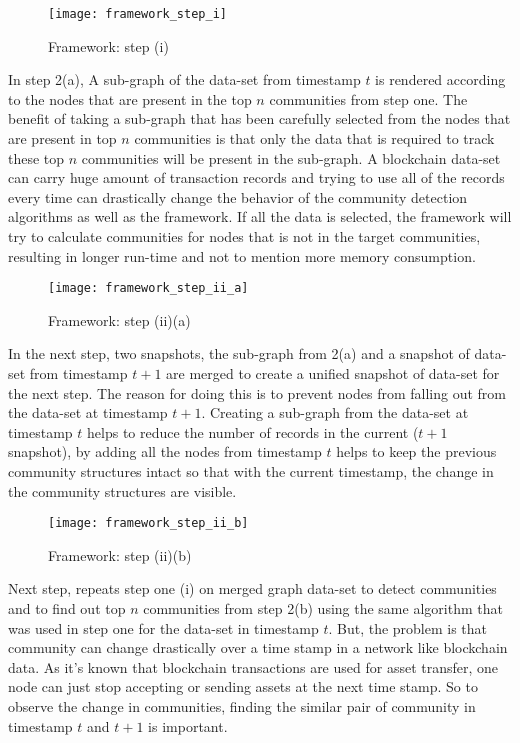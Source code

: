 \begin{figure}[H]
	\centering
	\texttt{[image: framework\_step\_i]}
	\caption{Framework: step (i)}
	\label{fig:community}
\end{figure}

In step 2(a), A sub-graph of the data-set from timestamp $t$ is rendered according to the nodes that are present in the top $n$ communities from step one. The benefit of taking a sub-graph that has been carefully selected from the nodes that are present in top $n$ communities is that only the data that is required to track these top $n$ communities will be present in the sub-graph. A blockchain data-set can carry huge amount of transaction records and trying to use all of the records every time can drastically change the behavior of the community detection algorithms as well as the framework. If all the data is selected, the framework will try to calculate communities for nodes that is not in the target communities, resulting in longer run-time and not to mention more memory consumption.

\begin{figure}[H]
	\centering
	\texttt{[image: framework\_step\_ii\_a]}
	\caption{Framework: step (ii)(a)}
	\label{fig:community}
\end{figure}

In the next step, two snapshots, the sub-graph from 2(a) and a snapshot of data-set from timestamp $t+1$ are merged to create a unified snapshot of data-set for the next step. The reason for doing this is to prevent nodes from falling out from the data-set at timestamp $t+1$. Creating a sub-graph from the data-set at timestamp $t$ helps to reduce the number of records in the current ($t+1$ snapshot), by  adding all the nodes from timestamp $t$ helps to keep the previous community structures intact so that with the current timestamp, the change in the community structures are visible.

\begin{figure}[H]
	\centering
	\texttt{[image: framework\_step\_ii\_b]}
	\caption{Framework: step (ii)(b)}
	\label{fig:community}
\end{figure}

Next step, repeats step one (i) on merged graph data-set to detect communities and to find out top $n$ communities from step 2(b) using the same algorithm that was used in step one for the data-set in timestamp $t$. But, the problem is that community can change drastically over a time stamp in a network like blockchain data. As it's known that blockchain transactions are used for asset transfer, one node can just stop accepting or sending assets at the next time stamp. So to observe the change in communities, finding the similar pair of community in timestamp $t$ and $t+1$ is important.

